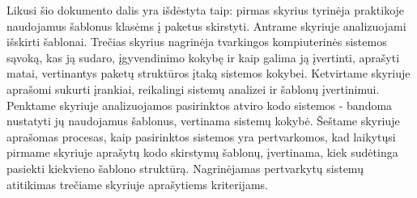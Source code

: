 Likusi šio dokumento dalis yra išdėstyta taip:
pirmas skyrius tyrinėja praktikoje naudojamus šablonus klasėms į paketus skirstyti.
Antrame skyriuje analizuojami išskirti šablonai.
Trečias skyrius nagrinėja tvarkingos kompiuterinės sistemos sąvoką, kas ją sudaro, įgyvendinimo kokybę ir kaip galima ją įvertinti,
aprašyti matai, vertinantys paketų struktūros įtaką sistemos kokybei.
Ketvirtame skyriuje aprašomi sukurti įrankiai, reikalingi sistemų analizei ir šablonų įvertinimui.
Penktame skyriuje analizuojamos pasirinktos atviro kodo sistemos - bandoma nustatyti jų naudojamus šablonus, vertinama sistemų kokybė.
Šeštame skyriuje aprašomas procesas, kaip pasirinktos sistemos yra pertvarkomos, kad laikytųsi pirmame skyriuje aprašytų kodo skirstymų šablonų, įvertinama, kiek sudėtinga pasiekti kiekvieno šablono struktūrą.
Nagrinėjamas pertvarkytų sistemų atitikimas trečiame skyriuje aprašytiems kriterijams.
